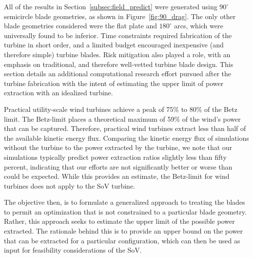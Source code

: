 All of the results in Section~\ref{subsec:field_predict} were
generated using $90^{\circ}$ semicircle blade geometries, as shown in
Figure~\ref{fig:90_drag}. The only other blade geometries considered
were the flat plate and $180^{\circ}$ arcs, which were universally found
to be inferior. Time constraints required fabrication of the turbine in
short order, and a limited budget encouraged inexpensive (and therefore 
simple) turbine blades. 
Risk mitigation also played a
role, with an emphasis on traditional, and therefore well-vetted turbine
blade design. %
This section details an additional computational research 
effort pursued after the turbine fabrication with the intent of estimating
the upper limit of power extraction with an idealized turbine. 

Practical utility-scale wind turbines achieve a peak of 75\% to 80\% of
the Betz limit\cite{burton2001wind}. The Betz-limit places a theoretical 
maximum of 59\% of the wind's power that can be captured. Therefore,
practical wind turbines extract less than half of the available kinetic
energy flux. 
Comparing the kinetic energy flux of simulations without the turbine to
the power extracted by the turbine, we note that our simulations
typically predict power extraction ratios slightly less than fifty
percent, indicating that our efforts are not significantly better or
worse than could be expected. While this provides an estimate, the
Betz-limit for wind turbines does not apply to the SoV turbine. 


The objective then, is to formulate a generalized approach to treating the
blades to permit an optimization that is not
constrained to a particular blade geometry. Rather, this
approach seeks to estimate the upper limit of the possible power
extracted. The rationale behind this is to provide an upper bound on the
power that can be extracted for a particular configuration, which can
then be used as input for feasibility considerations of the SoV.  

